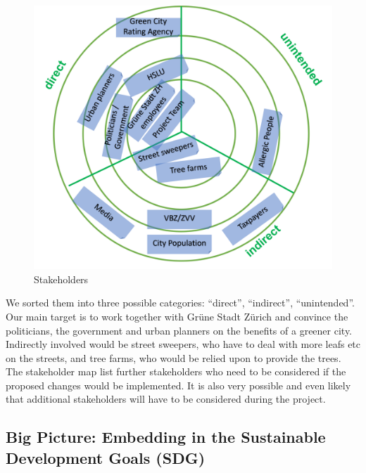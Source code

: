 \documentclass[
]{article}
\begin{document}
\begin{figure}
\centering
\includegraphics{../images/Stakeholders.png}
\caption{Stakeholders}
\end{figure}

We sorted them into three possible categories: ``direct'', ``indirect'',
``unintended''. Our main target is to work together with Grüne Stadt
Zürich and convince the politicians, the government and urban planners
on the benefits of a greener city. Indirectly involved would be street
sweepers, who have to deal with more leafs etc on the streets, and tree
farms, who would be relied upon to provide the trees. The stakeholder
map list further stakeholders who need to be considered if the proposed
changes would be implemented. It is also very possible and even likely
that additional stakeholders will have to be considered during the
project.

\hypertarget{big-picture-embedding-in-the-sustainable-development-goals-sdg}{%
\subsection{Big Picture: Embedding in the Sustainable Development Goals
(SDG)}\label{big-picture-embedding-in-the-sustainable-development-goals-sdg}}
\end{document}
